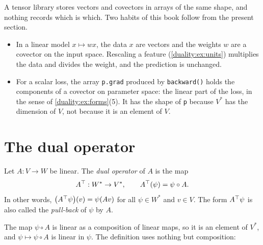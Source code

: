 \begin{notechapter}
\begin{mlthread}
A tensor library stores vectors and covectors in arrays of the same shape,
and nothing records which is which. Two habits of this book follow from
the present section.
\begin{itemize}[nosep]
  \item In a linear model $x\mapsto wx$, the data $x$ are vectors and the
        weights $w$ are a covector on the input space. Rescaling a
        feature (\cref{duality:ex:units}) multiplies the data and divides
        the weight, and the prediction is unchanged.
  \item For a scalar loss, the array \texttt{p.grad} produced by
        \texttt{backward()} holds the components of a covector on
        parameter space: the linear part of the loss, in the sense of
        \cref{duality:ex:forms}(5). It has the shape of \texttt{p} because
        $V^*$ has the dimension of $V$, not because it is an element
        of $V$.
\end{itemize}
\end{mlthread}

\section{The dual operator}\label{duality:sec:dual-operator}

\begin{definition}\label{duality:def:dual-operator}
Let $A:V\to W$ be linear. The \emph{dual operator} of $A$ is the map
\[
  A^{\top}:W^*\to V^* ,\qquad A^{\top}(\psi) = \psi\circ A .
\]
In other words, $\bigl(A^{\top}\psi\bigr)(v) = \psi(Av)$ for all
$\psi\in W^*$ and $v\in V$. The form $A^{\top}\psi$ is also called the
\emph{pull-back} of $\psi$ by $A$.
\end{definition}

The map $\psi\circ A$ is linear as a composition of linear maps, so it is
an element of $V^*$, and $\psi\mapsto\psi\circ A$ is linear in $\psi$. The
definition uses nothing but composition:
\begin{center}
\qquad\qquad
{}
\end{center}


\end{notechapter}
